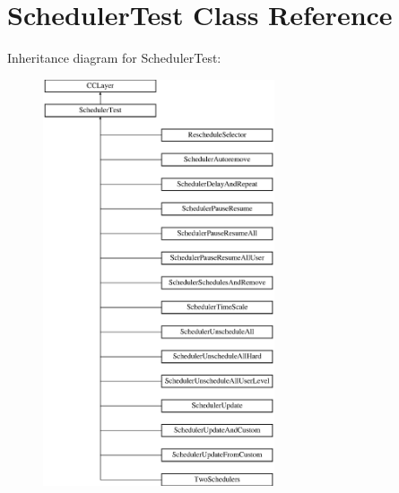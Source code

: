 \hypertarget{interface_scheduler_test}{\section{Scheduler\-Test Class Reference}
\label{interface_scheduler_test}
}
Inheritance diagram for Scheduler\-Test\-:\begin{figure}[H]
\begin{center}
\leavevmode
\includegraphics[height=12.000000cm]{interface_scheduler_test}
\end{center}
\end{figure}
